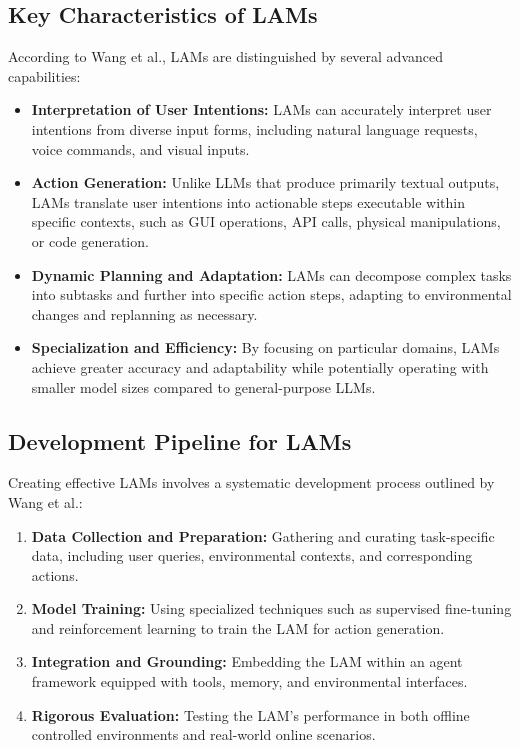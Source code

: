 \documentclass[journal,twoside,10pt]{IEEEtran}
\begin{document}
\subsection{Key Characteristics of LAMs}
According to Wang et al., LAMs are distinguished by several advanced capabilities:

\begin{itemize}
    \item \textbf{Interpretation of User Intentions:} LAMs can accurately interpret user intentions from diverse input forms, including natural language requests, voice commands, and visual inputs.
    \item \textbf{Action Generation:} Unlike LLMs that produce primarily textual outputs, LAMs translate user intentions into actionable steps executable within specific contexts, such as GUI operations, API calls, physical manipulations, or code generation.
    \item \textbf{Dynamic Planning and Adaptation:} LAMs can decompose complex tasks into subtasks and further into specific action steps, adapting to environmental changes and replanning as necessary.
    \item \textbf{Specialization and Efficiency:} By focusing on particular domains, LAMs achieve greater accuracy and adaptability while potentially operating with smaller model sizes compared to general-purpose LLMs.
\end{itemize}

\subsection{Development Pipeline for LAMs}
Creating effective LAMs involves a systematic development process outlined by Wang et al.:

\begin{enumerate}
    \item \textbf{Data Collection and Preparation:} Gathering and curating task-specific data, including user queries, environmental contexts, and corresponding actions.
    \item \textbf{Model Training:} Using specialized techniques such as supervised fine-tuning and reinforcement learning to train the LAM for action generation.
    \item \textbf{Integration and Grounding:} Embedding the LAM within an agent framework equipped with tools, memory, and environmental interfaces.
    \item \textbf{Rigorous Evaluation:} Testing the LAM's performance in both offline controlled environments and real-world online scenarios.
\end{enumerate}
\end{document}
